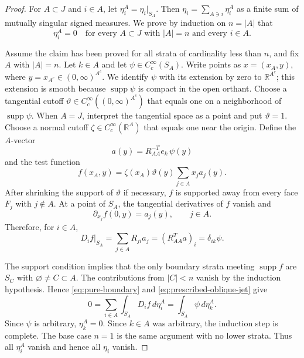 \documentclass[aihp]{imsart}
\numberwithin{equation}{section}
\theoremstyle{plain}
\theoremstyle{definition}
\newcommand{\R}{\mathbb R}
\newcommand{\supp}{\operatorname{supp}}
\newcommand{\1}{\mathbf 1}
\begin{document}
\begin{proof}
For $A\subset J$ and $i\in A$, let $ \eta_i^A=\eta_i|_{S_A}.$ Then $\eta_i=\sum_{A\ni i}\eta_i^A$ as a finite sum of mutually singular signed measures. We prove by induction on $n=|A|$ that
\begin{equation}\label{eq:induction-claim}
 \eta_i^A=0
 \quad\text{for every }A\subset J\text{ with }|A|=n
 \text{ and every }i\in A.
\end{equation}

Assume the claim has been proved for all strata of cardinality less than $n$, and fix $A$ with $|A|=n$. Let $k\in A$ and let $\psi\in C_c^\infty(S_A)$. Write points as $x=(x_A,y)$, where $y=x_{A^c}\in(0,\infty)^{A^c}$. We identify $\psi$ with its extension by zero to $\R^{A^c}$; this extension is smooth because $\supp\psi$ is compact in the open orthant. Choose a tangential cutoff $\vartheta\in C_c^\infty((0,\infty)^{A^c})$ that equals one on a neighborhood of $\supp\psi$. When $A=J$, interpret the tangential space as a point and put $\vartheta=1$. Choose a normal cutoff $\zeta\in C_c^\infty(\R^A)$ that equals one near the origin. Define the $A$-vector
\begin{equation}\label{eq:a-vector}
 a(y)=R_{AA}^{-T}e_k\,\psi(y)
\end{equation}
and the test function
\begin{equation}\label{eq:boundary-test}
 f(x_A,y)=\zeta(x_A)\vartheta(y)
 \sum_{j\in A}x_j a_j(y).
\end{equation}
After shrinking the support of $\vartheta$ if necessary, $f$ is supported away from every face $F_j$ with $j\notin A$. At a point of $S_A$, the tangential derivatives of $f$ vanish and
\begin{equation}\label{eq:active-jet}
 \partial_{x_j}f(0,y)=a_j(y),
 \qquad j\in A.
\end{equation}
Therefore, for $i\in A$,
\begin{equation}\label{eq:prescribed-oblique-jet}
 D_i f|_{S_A}
 =\sum_{j\in A}R_{ji}a_j
 =(R_{AA}^Ta)_i
 =\delta_{ik}\psi.
\end{equation}

The support condition implies that the only boundary strata meeting $\supp f$ are $S_C$ with $\varnothing\ne C\subset A$. The contributions from $|C|<n$ vanish by the induction hypothesis. Hence \eqref{eq:pure-boundary} and \eqref{eq:prescribed-oblique-jet} give
\[
 0=\sum_{i\in A}\int_{S_A}D_i f\,d\eta_i^A
 =\int_{S_A}\psi\,d\eta_k^A.
\]
Since $\psi$ is arbitrary, $\eta_k^A=0$. Since $k\in A$ was arbitrary, the induction step is complete. The base case $n=1$ is the same argument with no lower strata. Thus all $\eta_i^A$ vanish and hence all $\eta_i$ vanish.
\end{proof}
\end{document}
